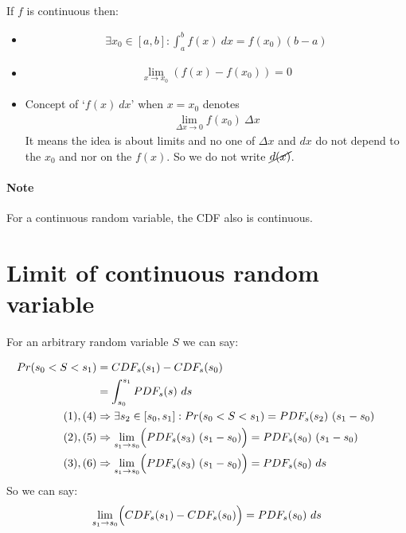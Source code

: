 \documentclass[a4paper]{article}
\begin{document}
\paragraph*{}
If $f$ is continuous then:
\begin{itemize}
    \item {
        \begin{align}
            \exists x_0 \in [a,b] : \int_{a}^{b} f(x)\ dx = f(x_0) (b - a)
        \end{align}
    }     
    \item {
        \begin{align}
            \lim\limits_{x \to x_0} (f(x)-f(x_0)) = 0
        \end{align}
    }     
    \item Concept of `$f(x)\ dx$' when $x =x_0$ denotes {
        \begin{align}
            \lim\limits_{\Delta x \to 0} f(x_0)\ \Delta x
        \end{align}
    }  
    It means the idea is about limits and no one of $\Delta x$ and $dx$ do not
    depend to the $x_0$  and nor on the $f(x)$. So we do not write
    $\cancel{d(x)}$. 
\end{itemize}

\paragraph*{Note} For a continuous random variable, the CDF also is continuous.



\pagebreak

\section{Limit of continuous random variable}

For an arbitrary random variable $S$ we can say:

\begin{align}
    Pr(s_0 < S < s_1) &= CDF_s(s_1) - CDF_s(s_0) \nonumber \\ 
                      &= \int_{s_0}^{s_1} PDF_s(s) \ ds&&\\
               (1),(4)& \Rightarrow \exists s_2 \in [s_0,s_1] : Pr(s_0 < S < s_1) = PDF_s (s_2) \ (s_1 - s_0)\\
               (2),(5)& \Rightarrow \lim\limits_{s_1\to s_0} \Bigl(PDF_s(s_3)  \  (s_1 - s_0)\Bigr) = PDF_s(s_0) \  (s_1 - s_0) \\
               (3),(6)&  \Rightarrow \lim\limits_{s_1\to s_0} \Bigl(PDF_s(s_3)  \  (s_1 - s_0)\Bigr) = PDF_s(s_0) \  ds \nonumber
\end{align}
So we can say:
\begin{align}
    \lim\limits_{s_1\to s_0} \Bigl(CDF_s(s_1) - CDF_s(s_0)\Bigr) = PDF_s(s_0) \  ds
\end{align}
\end{document}
